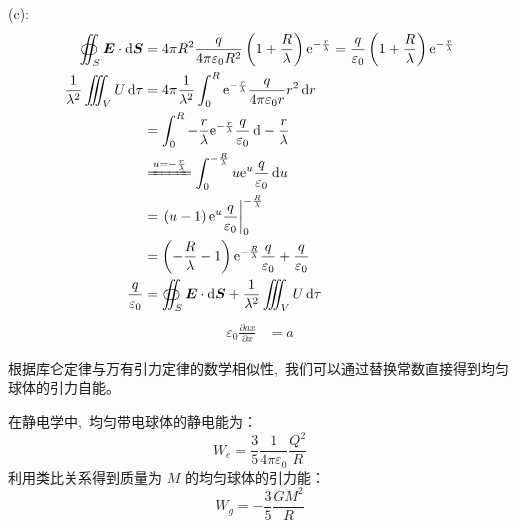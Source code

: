 (c):
\begin{align*}
    \oiint_S\boldsymbol{E}\cdot\dif\boldsymbol{S}&=4\pi R^2\dfrac{q}{4\pi\varepsilon_0R^2}\left(1+\frac{R}{\lambda}\right)\mathrm{e}^{-\frac{r}{\lambda}}
    =\dfrac{q}{\varepsilon_0}\left(1+\frac{R}{\lambda}\right)\mathrm{e}^{-\frac{r}{\lambda}}\\
    \frac{1}{\lambda^2}\iiint_VU\dif\tau&=4\pi\frac{1}{\lambda^2}\int_0^R\mathrm{e}^{-\frac{r}{\lambda}}\dfrac{q}{4\pi\varepsilon_0r}r^2\dif r\\
    &=\int_0^R-\frac{r}{\lambda}\mathrm{e}^{-\frac{r}{\lambda}}\dfrac{q}{\varepsilon_0}\dif -\frac{r}{\lambda}\\
    &\xlongequal{u=-\frac{r}{\lambda}}\int_0^{-\frac{R}{\lambda}}u\mathrm{e}^{u}\dfrac{q}{\varepsilon_0}\dif u\\
    &=\left.\left(u-1\right)\mathrm{e}^{u}\dfrac{q}{\varepsilon_0}\right|_0^{-\frac{R}{\lambda}}\\
    &=\left(-\frac{R}{\lambda}-1\right)\mathrm{e}^{-\frac{R}{\lambda}}\dfrac{q}{\varepsilon_0}
    +\dfrac{q}{\varepsilon_0}\\
     \frac{q}{\varepsilon_0}&=\oiint_S\boldsymbol{E}\cdot\dif\boldsymbol{S}+\frac{1}{\lambda^2}\iiint_VU\dif\tau
\end{align*}
\begin{align*}
    \varepsilon_0\frac{\partial ax}{\partial x}
    &=a
\end{align*}


根据库仑定律与万有引力定律的数学相似性, \,我们可以通过替换常数直接得到均匀球体的引力自能。

在静电学中, \,均匀带电球体的静电能为：
\begin{equation}
    W_e = \frac{3}{5} \frac{1}{4\pi\varepsilon_0} \frac{Q^2}{R}
\end{equation}
利用类比关系得到质量为 $M$ 的均匀球体的引力能：
\begin{equation}
    W_g = -\frac{3}{5} \frac{GM^2}{R}
\end{equation}


